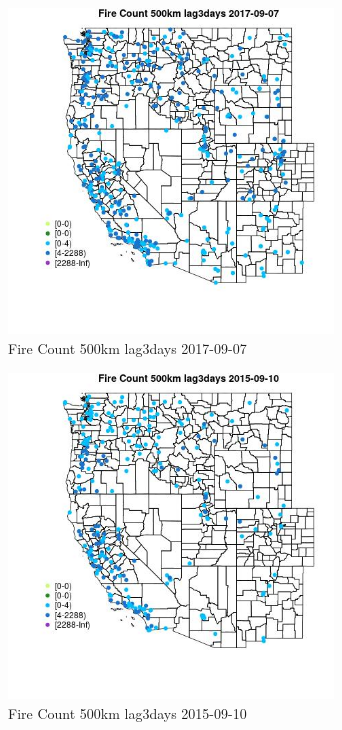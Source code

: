 \begin{figure} 
\centering  
\includegraphics[width=0.77\textwidth]{Code_Outputs/Report_ML_input_PM25_Step4_part_e_de_duplicated_aves_compiled_2019-05-20wNAs_MapObsFire_Count_500km_lag3days2017-09-07.jpg} 
\caption{\label{fig:Report_ML_input_PM25_Step4_part_e_de_duplicated_aves_compiled_2019-05-20wNAsMapObsFire_Count_500km_lag3days2017-09-07}Fire Count 500km lag3days 2017-09-07} 
\end{figure} 
 

\begin{figure} 
\centering  
\includegraphics[width=0.77\textwidth]{Code_Outputs/Report_ML_input_PM25_Step4_part_e_de_duplicated_aves_compiled_2019-05-20wNAs_MapObsFire_Count_500km_lag3days2015-09-10.jpg} 
\caption{\label{fig:Report_ML_input_PM25_Step4_part_e_de_duplicated_aves_compiled_2019-05-20wNAsMapObsFire_Count_500km_lag3days2015-09-10}Fire Count 500km lag3days 2015-09-10} 
\end{figure} 
 

